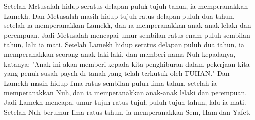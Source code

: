 \begin{biblechapter}
\verse Setelah Metusalah hidup seratus delapan puluh tujuh tahun, ia memperanakkan Lamekh.
\verse Dan Metusalah masih hidup tujuh ratus delapan puluh dua tahun, setelah ia memperanakkan Lamekh, dan ia memperanakkan anak-anak lelaki dan perempuan.
\verse Jadi Metusalah mencapai umur sembilan ratus enam puluh sembilan tahun, lalu ia mati.
\verse Setelah Lamekh hidup seratus delapan puluh dua tahun, ia memperanakkan seorang anak laki-laki,
\verse dan memberi nama Nuh kepadanya, katanya: "Anak ini akan memberi kepada kita penghiburan dalam pekerjaan kita yang penuh susah payah di tanah yang telah terkutuk oleh TUHAN."
\verse Dan Lamekh masih hidup lima ratus sembilan puluh lima tahun, setelah ia memperanakkan Nuh, dan ia memperanakkan anak-anak lelaki dan perempuan.
\verse Jadi Lamekh mencapai umur tujuh ratus tujuh puluh tujuh tahun, lalu ia mati.
\verse Setelah Nuh berumur lima ratus tahun, ia memperanakkan Sem, Ham dan Yafet.
\end{biblechapter}

